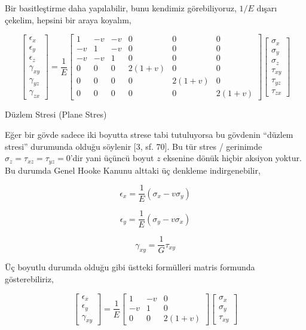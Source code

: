 \documentclass[12pt,fleqn]{article}\usepackage{../../common}
\begin{document}
Bir basitleştirme daha yapılabilir, bunu kendimiz görebiliyoruz, $1/E$ dışarı
çekelim, hepsini bir araya koyalım,

$$
\left[\begin{array}{c}
\epsilon_x \\ \epsilon_y \\ \epsilon_z \\ \gamma_{xy} \\ \gamma_{yz} \\ \gamma_{zx}
\end{array}\right] =
\frac{1}{E}
\left[\begin{array}{cccccc}
1 & -v & -v & 0 & 0 & 0 \\
-v & 1 & -v & 0 & 0 & 0 \\
-v & -v & 1 & 0 & 0 & 0 \\
0 & 0 & 0 & 2(1+v) & 0 & 0 \\
0 & 0 & 0 & 0 & 2(1+v) & 0 \\
0 & 0 & 0 & 0 & 0 & 2(1+v)
\end{array}\right]
\left[\begin{array}{c}
\sigma_x \\ \sigma_y \\ \sigma_z \\ \tau_{xy} \\ \tau_{yz} \\ \tau_{zx}
\end{array}\right]
$$

Düzlem Stresi (Plane Stres)

Eğer bir gövde sadece iki boyutta strese tabi tutuluyorsa bu gövdenin ``düzlem
stresi'' durumunda olduğu söylenir [3, sf. 70]. Bu tür stres / gerinimde
$\sigma_z = \tau_{xz} = \tau_{yz} = 0$'dir yani üçüncü boyut $z$ eksenine dönük
hiçbir aksiyon yoktur. Bu durumda Genel Hooke Kanunu alttaki üç denkleme
indirgenebilir,

$$
\epsilon_x = \frac{1}{E} (\sigma_x - v \sigma_y )
$$

$$
\epsilon_y = \frac{1}{E} (\sigma_y - v \sigma_x )
$$

$$
\gamma_{xy} = \frac{1}{G} \tau_{xy}
$$

Üç boyutlu durumda olduğu gibi üstteki formülleri matris formunda
gösterebiliriz,

$$
\left[\begin{array}{c}
\epsilon_{x} \\ \epsilon_{y} \\ \gamma_{xy}
\end{array}\right] =
\frac{1}{E}
\left[\begin{array}{ccc}
1 & -v & 0 \\
-v & 1 & 0 \\
0 & 0 & 2(1+v)
\end{array}\right]
\left[\begin{array}{c}
\sigma_x \\ \sigma_y \\ \tau_{xy}
\end{array}\right]
$$
\end{document}
